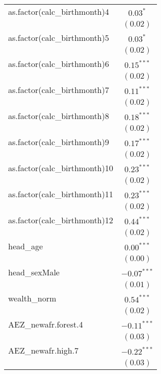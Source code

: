 \begin{longtable}{l c }
as.factor(calc\_birthmonth)4     & $0.03^{*}$     \\
                                 & $(0.02)$       \\
as.factor(calc\_birthmonth)5     & $0.03^{*}$     \\
                                 & $(0.02)$       \\
as.factor(calc\_birthmonth)6     & $0.15^{***}$   \\
                                 & $(0.02)$       \\
as.factor(calc\_birthmonth)7     & $0.11^{***}$   \\
                                 & $(0.02)$       \\
as.factor(calc\_birthmonth)8     & $0.18^{***}$   \\
                                 & $(0.02)$       \\
as.factor(calc\_birthmonth)9     & $0.17^{***}$   \\
                                 & $(0.02)$       \\
as.factor(calc\_birthmonth)10    & $0.23^{***}$   \\
                                 & $(0.02)$       \\
as.factor(calc\_birthmonth)11    & $0.23^{***}$   \\
                                 & $(0.02)$       \\
as.factor(calc\_birthmonth)12    & $0.44^{***}$   \\
                                 & $(0.02)$       \\
head\_age                        & $0.00^{***}$   \\
                                 & $(0.00)$       \\
head\_sexMale                    & $-0.07^{***}$  \\
                                 & $(0.01)$       \\
wealth\_norm                     & $0.54^{***}$   \\
                                 & $(0.02)$       \\
AEZ\_newafr.forest.4             & $-0.11^{***}$  \\
                                 & $(0.03)$       \\
AEZ\_newafr.high.7               & $-0.22^{***}$  \\
                                 & $(0.03)$       \\

\end{longtable}
